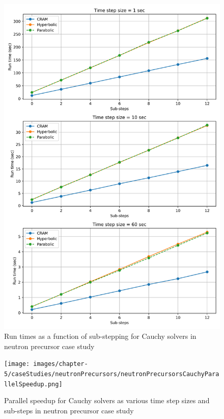 \begin{figure}[p]
    \centering
    \includegraphics[width=5in]{images/chapter-5/caseStudies/neutronPrecursors/neutronPrecursorsCauchyRuntimes.png}
    \caption{Run times as a function of sub-stepping for Cauchy solvers in neutron precursor case study}
    \label{fig:neutron_precursors_substepping_cauchy_runtimes}
\end{figure}

\clearpage

\begin{landscape}
\thispagestyle{mylandscape}
\begin{figure}[p]
    \centering
    \texttt{[image: images/chapter-5/caseStudies/neutronPrecursors/neutronPrecursorsCauchyParallelSpeedup.png]}
    \caption{Parallel speedup for Cauchy solvers as various time step sizes and sub-steps in neutron precursor case study}
    \label{fig:neutron_precursors_cauchy_speedup}
\end{figure}
\end{landscape}

